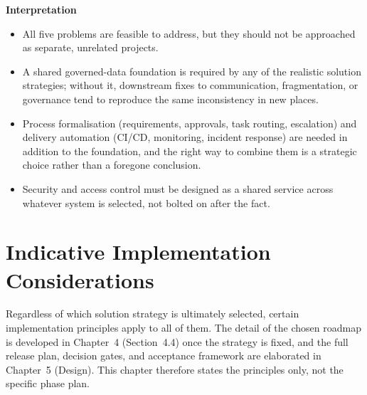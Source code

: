 \documentclass[12pt,a4paper]{report}
\begin{document}
\textbf{Interpretation}
\begin{itemize}[leftmargin=2em]
    \item All five problems are feasible to address, but they should not be approached as separate, unrelated projects.
    \item A shared governed-data foundation is required by any of the realistic solution strategies; without it, downstream fixes to communication, fragmentation, or governance tend to reproduce the same inconsistency in new places.
    \item Process formalisation (requirements, approvals, task routing, escalation) and delivery automation (CI/CD, monitoring, incident response) are needed in addition to the foundation, and the right way to combine them is a strategic choice rather than a foregone conclusion.
    \item Security and access control must be designed as a shared service across whatever system is selected, not bolted on after the fact.
\end{itemize}

\section{Indicative Implementation Considerations}
Regardless of which solution strategy is ultimately selected, certain implementation principles apply to all of them. The detail of the chosen roadmap is developed in Chapter~4 (Section~4.4) once the strategy is fixed, and the full release plan, decision gates, and acceptance framework are elaborated in Chapter~5 (Design). This chapter therefore states the principles only, not the specific phase plan.
\end{document}
